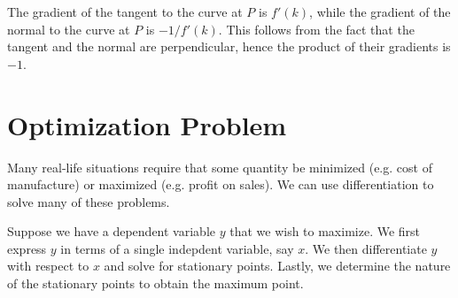 \begin{figure}[H]
    \centering
    \caption{}
\end{figure}

The gradient of the tangent to the curve at $P$ is $f'(k)$, while the gradient of the normal to the curve at $P$ is $-1/f'(k)$. This follows from the fact that the tangent and the normal are perpendicular, hence the product of their gradients is $-1$.

\section{Optimization Problem}

Many real-life situations require that some quantity be minimized (e.g. cost of manufacture) or maximized (e.g. profit on sales). We can use differentiation to solve many of these problems.

\begin{recipe}
    Suppose we have a dependent variable $y$ that we wish to maximize. We first express $y$ in terms of a single indepdent variable, say $x$. We then differentiate $y$ with respect to $x$ and solve for stationary points. Lastly, we determine the nature of the stationary points to obtain the maximum point.
\end{recipe}

